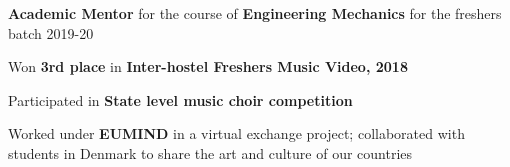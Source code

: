 
\begin{cventries}
	\vspace{-5.0mm}
	\cventry{}{}{}{}
	{
		\begin{cvitems}
			\item {\textbf{Academic Mentor} for the course of \textbf{Engineering Mechanics} for the freshers batch 2019-20}
			\item {Won \textbf{3rd place} in \textbf{Inter-hostel Freshers Music Video, 2018}}
			\item {Participated in \textbf{State level music choir competition}}
			\item {Worked under \textbf{EUMIND} in a virtual exchange project; collaborated with students in Denmark to share the art and culture of our countries}
		\end{cvitems}
	}
\end{cventries}
